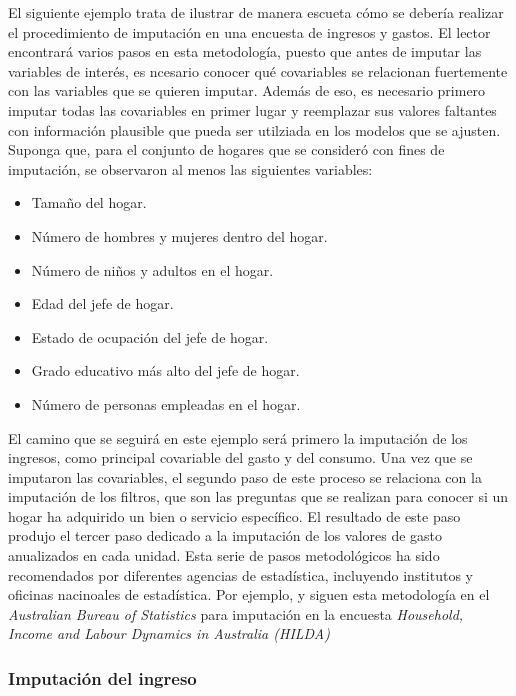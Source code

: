 \documentclass[
  10pt,
  spanish,
]{book}
\providecommand{\tightlist}{%
  \setlength{\itemsep}{0pt}\setlength{\parskip}{0pt}}
\begin{document}
El siguiente ejemplo trata de ilustrar de manera escueta cómo se debería realizar el procedimiento de imputación en una encuesta de ingresos y gastos. El lector encontrará varios pasos en esta metodología, puesto que antes de imputar las variables de interés, es ncesario conocer qué covariables se relacionan fuertemente con las variables que se quieren imputar. Además de eso, es necesario primero imputar todas las covariables en primer lugar y reemplazar sus valores faltantes con información plausible que pueda ser utilziada en los modelos que se ajusten. Suponga que, para el conjunto de hogares que se consideró con fines de imputación, se observaron al menos las siguientes variables:

\begin{itemize}
\tightlist
\item
  Tamaño del hogar.
\item
  Número de hombres y mujeres dentro del hogar.
\item
  Número de niños y adultos en el hogar.
\item
  Edad del jefe de hogar.
\item
  Estado de ocupación del jefe de hogar.
\item
  Grado educativo más alto del jefe de hogar.
\item
  Número de personas empleadas en el hogar.
\end{itemize}

El camino que se seguirá en este ejemplo será primero la imputación de los ingresos, como principal covariable del gasto y del consumo. Una vez que se imputaron las covariables, el segundo paso de este proceso se relaciona con la imputación de los filtros, que son las preguntas que se realizan para conocer si un hogar ha adquirido un bien o servicio específico. El resultado de este paso produjo el tercer paso dedicado a la imputación de los valores de gasto anualizados en cada unidad. Esta serie de pasos metodológicos ha sido recomendados por diferentes agencias de estadística, incluyendo institutos y oficinas nacinoales de estadística. Por ejemplo, \citet{Hayes_Watson_2009} y \citet{Sun_2010} siguen esta metodología en el \emph{Australian Bureau of Statistics} para imputación en la encuesta \emph{Household, Income and Labour Dynamics in Australia (HILDA)}

\hypertarget{imputaciuxf3n-del-ingreso}{%
\subsubsection*{Imputación del ingreso}\label{imputaciuxf3n-del-ingreso}}
\end{document}
